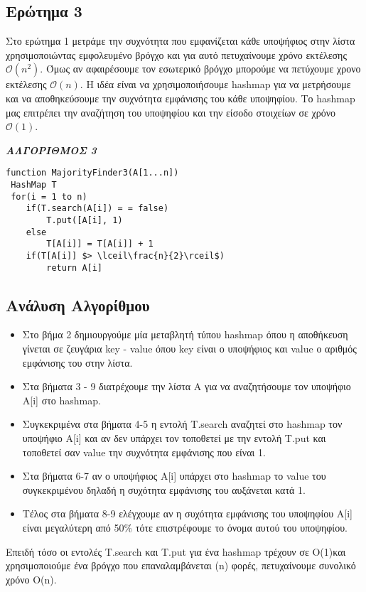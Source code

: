 \documentclass[a4paper]{article}
\begin{document}
\subsection*{\color{red}Ερώτημα 3}
Στο ερώτημα 1 μετράμε την συχνότητα που εμφανίζεται κάθε υποψήφιος στην λίστα χρησιμοποιώντας εμφολευμένο βρόγχο και για αυτό πετυχαίνουμε χρόνο εκτέλεσης $\mathcal{O}(n^2)$.
Όμως αν αφαιρέσουμε τον εσωτερικό βρόγχο μπορούμε να πετύχουμε χρονο εκτέλεσης $\mathcal{O}(n)$.
Η ιδέα είναι να χρησιμοποιήσουμε hashmap για να μετρήσουμε και να αποθηκεύσουμε την συχνότητα εμφάνισης του κάθε υποψηφίου. Το hashmap μας επιτρέπει την αναζήτηση του υποψηφίου και την είσοδο στοιχείων σε χρόνο $\mathcal{O}(1)$\footnotemark[7].

\begin{center}
\textit{\textbf{ΑΛΓΟΡΙΘΜΟΣ 3}}
\end{center}

\begin{lstlisting}[mathescape]
function MajorityFinder3(A[1...n])
 HashMap T
 for(i = 1 to n)
 	if(T.search(A[i]) = = false)
 		T.put([A[i], 1)
 	else 
 		T[A[i]] = T[A[i]] + 1
 	if(T[A[i]] $> \lceil\frac{n}{2}\rceil$)
 		return A[i]
\end{lstlisting}

\subsection*{Ανάλυση Αλγορίθμου}
\begin{itemize}
\item Στο βήμα 2 δημιουργούμε μία μεταβλητή τύπου hashmap όπου η αποθήκευση γίνεται σε ζευγάρια key - value όπου key είναι ο υποψήφιος και value ο αριθμός εμφάνισης του στην λίστα.
\item Στα βήματα 3 - 9 διατρέχουμε την λίστα Α για να αναζητήσουμε τον υποψήφιο Α[i] στο hashmap.
\item Συγκεκριμένα στα βήματα 4-5 η εντολή T.search αναζητεί στο hashmap τον υποψήφιο Α[i] και αν δεν υπάρχει τον τοποθετεί με την εντολή T.put και τοποθετεί σαν value την συχνότητα εμφάνισης που είναι 1.
\item Στα βήματα 6-7 αν ο υποψήφιος Α[i] υπάρχει στο hashmap το value του συγκεκριμένου δηλαδή η συχότητα εμφάνισης του αυξάνεται κατά 1.
\item Τέλος στα βήματα 8-9 ελέγχουμε αν η συχότητα εμφάνισης του υποψηφίου Α[i] είναι μεγαλύτερη από 50\% τότε επιστρέφουμε το όνομα αυτού του υποψηφίου. 
\end{itemize}
Επειδή τόσο οι εντολές T.search και Τ.put για ένα hashmap τρέχουν σε O(1)\footnotemark[7] και χρησιμοποιούμε ένα βρόγχο που επαναλαμβάνεται (n) φορές, πετυχαίνουμε συνολικό χρόνο O(n).
\end{document}
